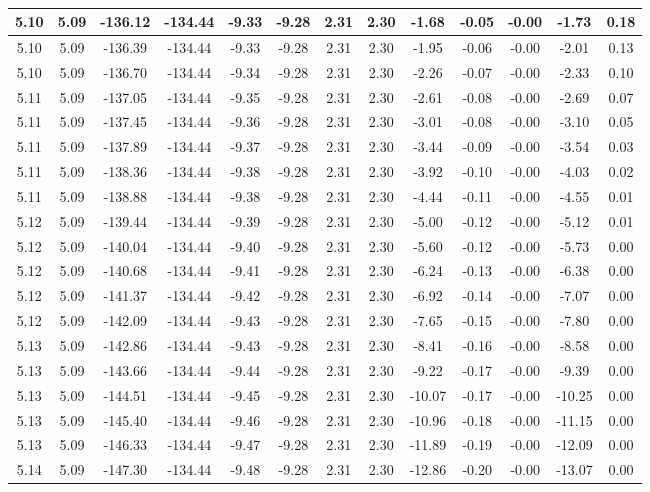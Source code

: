 \begin{table}[htbp]
\begin{adjustbox}{angle=90}
\begin{tabular}{|c|c|c|c|c|c|c|c|c|c|c|c|c|}
 5.10 & 5.09 & -136.12 & -134.44 & -9.33 & -9.28 & 2.31 & 2.30 & -1.68 & -0.05 & -0.00 & -1.73 & 0.18\\ \hline
 5.10 & 5.09 & -136.39 & -134.44 & -9.33 & -9.28 & 2.31 & 2.30 & -1.95 & -0.06 & -0.00 & -2.01 & 0.13\\ \hline
 5.10 & 5.09 & -136.70 & -134.44 & -9.34 & -9.28 & 2.31 & 2.30 & -2.26 & -0.07 & -0.00 & -2.33 & 0.10\\ \hline
 5.11 & 5.09 & -137.05 & -134.44 & -9.35 & -9.28 & 2.31 & 2.30 & -2.61 & -0.08 & -0.00 & -2.69 & 0.07\\ \hline
 5.11 & 5.09 & -137.45 & -134.44 & -9.36 & -9.28 & 2.31 & 2.30 & -3.01 & -0.08 & -0.00 & -3.10 & 0.05\\ \hline
 5.11 & 5.09 & -137.89 & -134.44 & -9.37 & -9.28 & 2.31 & 2.30 & -3.44 & -0.09 & -0.00 & -3.54 & 0.03\\ \hline
 5.11 & 5.09 & -138.36 & -134.44 & -9.38 & -9.28 & 2.31 & 2.30 & -3.92 & -0.10 & -0.00 & -4.03 & 0.02\\ \hline
 5.11 & 5.09 & -138.88 & -134.44 & -9.38 & -9.28 & 2.31 & 2.30 & -4.44 & -0.11 & -0.00 & -4.55 & 0.01\\ \hline
 5.12 & 5.09 & -139.44 & -134.44 & -9.39 & -9.28 & 2.31 & 2.30 & -5.00 & -0.12 & -0.00 & -5.12 & 0.01\\ \hline
 5.12 & 5.09 & -140.04 & -134.44 & -9.40 & -9.28 & 2.31 & 2.30 & -5.60 & -0.12 & -0.00 & -5.73 & 0.00\\ \hline
 5.12 & 5.09 & -140.68 & -134.44 & -9.41 & -9.28 & 2.31 & 2.30 & -6.24 & -0.13 & -0.00 & -6.38 & 0.00\\ \hline
 5.12 & 5.09 & -141.37 & -134.44 & -9.42 & -9.28 & 2.31 & 2.30 & -6.92 & -0.14 & -0.00 & -7.07 & 0.00\\ \hline
 5.12 & 5.09 & -142.09 & -134.44 & -9.43 & -9.28 & 2.31 & 2.30 & -7.65 & -0.15 & -0.00 & -7.80 & 0.00\\ \hline
 5.13 & 5.09 & -142.86 & -134.44 & -9.43 & -9.28 & 2.31 & 2.30 & -8.41 & -0.16 & -0.00 & -8.58 & 0.00\\ \hline
 5.13 & 5.09 & -143.66 & -134.44 & -9.44 & -9.28 & 2.31 & 2.30 & -9.22 & -0.17 & -0.00 & -9.39 & 0.00\\ \hline
 5.13 & 5.09 & -144.51 & -134.44 & -9.45 & -9.28 & 2.31 & 2.30 & -10.07 & -0.17 & -0.00 & -10.25 & 0.00\\ \hline
 5.13 & 5.09 & -145.40 & -134.44 & -9.46 & -9.28 & 2.31 & 2.30 & -10.96 & -0.18 & -0.00 & -11.15 & 0.00\\ \hline
 5.13 & 5.09 & -146.33 & -134.44 & -9.47 & -9.28 & 2.31 & 2.30 & -11.89 & -0.19 & -0.00 & -12.09 & 0.00\\ \hline
 5.14 & 5.09 & -147.30 & -134.44 & -9.48 & -9.28 & 2.31 & 2.30 & -12.86 & -0.20 & -0.00 & -13.07 & 0.00\\ \hline
            \end{tabular}
        \end{adjustbox}
        \caption{}
        \label{}
    \end{table}
    